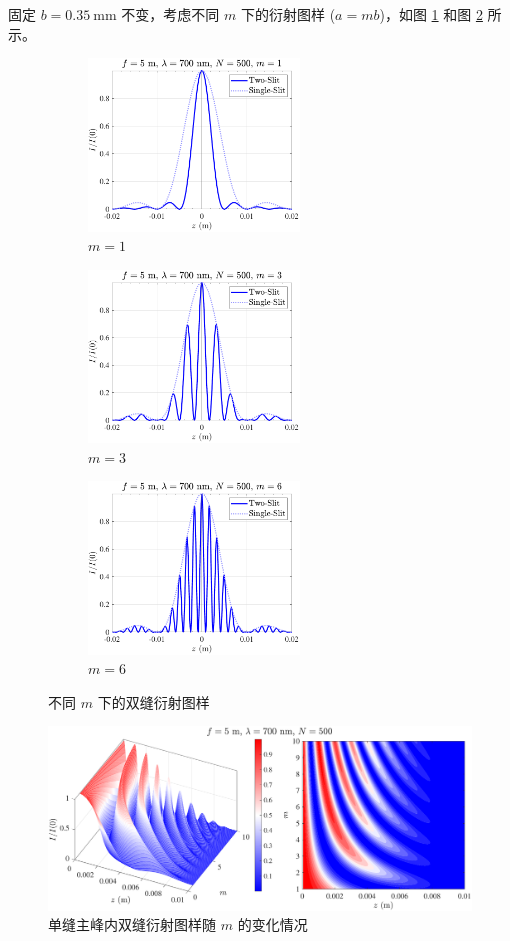 \documentclass[UTF8]{article}
\theoremstyle{MyLineTheoremStyle} %
\theoremstyle{MyBlockTheoremStyle} %
\theoremstyle{MySubsubsectionStyle} %
\begin{document}
固定 $b = 0.35 \ \mathrm{mm}$ 不变，考虑不同 $m$ 下的衍射图样 ($a = mb$)，如图 \ref{双缝衍射图样} 和图 \ref{主峰内双缝衍射图样变化} 所示。
\begin{figure}[H]\centering
    \begin{subfigure}[b]{0.33\columnwidth}\centering
        \includegraphics[height=130pt]{assets/0/4.3 m=1.pdf}
        \caption{$m=1$}
    \end{subfigure}\hfill
    \begin{subfigure}[b]{0.33\columnwidth}\centering
        \includegraphics[height=130pt]{assets/0/4.3 m=3.pdf}
        \caption{$m=3$}
    \end{subfigure}
    \begin{subfigure}[b]{0.33\columnwidth}\centering
        \includegraphics[height=130pt]{assets/0/4.3 m=6.pdf}
        \caption{$m=6$}
    \end{subfigure}
    \caption{不同 $m$ 下的双缝衍射图样}
    \label{双缝衍射图样}
\end{figure}
\begin{figure}[H]\centering
    \includegraphics[width=\columnwidth]{assets/0/4.3 m 变化.pdf}
    \caption{单缝主峰内双缝衍射图样随 $m$ 的变化情况}\label{主峰内双缝衍射图样变化}
\end{figure}
\end{document}
